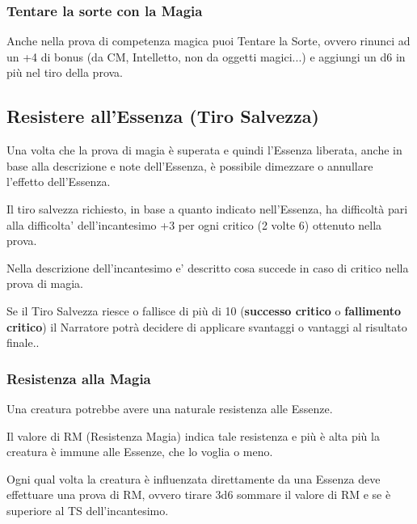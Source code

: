 \begin{multicols}{2}
\subsubsection{Tentare la sorte con la Magia}

\label{tentare-la-sorte-con-la-magia}

Anche nella prova di competenza magica puoi Tentare la Sorte, ovvero rinunci ad un +4 di bonus (da CM, Intelletto, non da oggetti magici...) e aggiungi un d6 in più nel tiro della prova.

\subsection{Resistere all'Essenza (Tiro Salvezza)}

\label{resistere-allessenza-tiro-salvezza}

Una volta che la prova di magia è superata e quindi l'Essenza liberata, anche in base alla descrizione e note dell'Essenza, è possibile dimezzare o annullare l'effetto dell'Essenza.

Il tiro salvezza richiesto, in base a quanto indicato nell'Essenza, ha difficoltà pari alla difficolta' dell'incantesimo +3 per ogni critico (2 volte 6) ottenuto nella prova.

Nella descrizione dell'incantesimo e' descritto cosa succede in caso di critico nella prova di magia.

Se il Tiro Salvezza riesce o fallisce di più di 10 (\textbf{successo critico} o \textbf{fallimento critico}) il Narratore potrà decidere di applicare svantaggi o vantaggi al risultato finale..

\subsubsection{Resistenza alla Magia}

Una creatura potrebbe avere una naturale resistenza alle Essenze.

Il valore di RM (Resistenza Magia) indica tale resistenza e più è alta più la creatura è immune alle Essenze, che lo voglia o meno.

Ogni qual volta la creatura è influenzata direttamente da una Essenza deve effettuare una prova di RM, ovvero tirare 3d6 sommare il valore di RM e se è superiore al TS dell'incantesimo.


\end{multicols}
